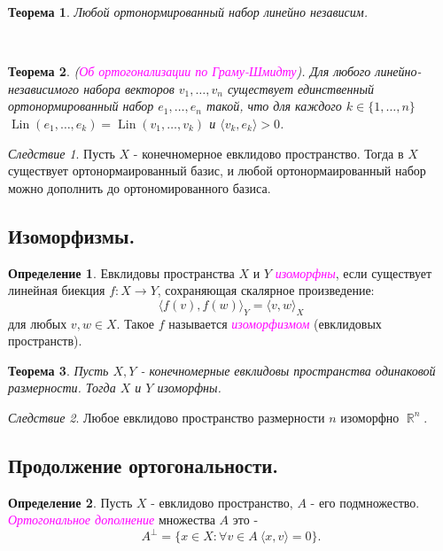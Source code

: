 \documentclass[a4paper,100pt]{article}
\theoremstyle{indented}
\newtheorem{theorem}{Теорема}
\theoremstyle{definition}
\newtheorem{defn}{Определение}
\theoremstyle{remark}
\newtheorem{cons}{Следствие}
\DeclareMathOperator{\ra}{\rightarrow}
\DeclareMathOperator{\RR}{\mathbb{R}}
\DeclareMathOperator{\Lin}{Lin}
\begin{document}
\begin{theorem}
    Любой ортонормированный набор линейно независим.
\end{theorem} \

\begin{theorem}
    (\textit{\textcolor{magenta}{\hypertarget{s64}{Об ортогонализации по Граму-Шмидту}}}). Для любого линейно-независимого набора векторов $v_1, \ldots, v_n$ существует единственный ортонормированный набор $e_1, \ldots, e_n$ такой, что для каждого $k\in \{1, \ldots, n\}$ $\Lin (e_1, \ldots, e_k)=\Lin(v_1, \ldots, v_k)$ и $\langle v_k, e_k \rangle > 0$. 
\end{theorem}

\begin{cons}
    Пусть $X$ - конечномерное евклидово пространство. Тогда в $X$ существует ортонормаированный базис, и любой ортонормаированный набор можно дополнить до ортономированного базиса.
\end{cons}

\subsection{Изоморфизмы.}

\begin{defn}
    Евклидовы пространства $X$ и $Y$ \textit{\textcolor{magenta}{\hypertarget{s65}{изоморфны}}}, если существует линейная биекция $f:X\ra Y$, сохраняющая скалярное произведение: 
    \[
        \langle f(v), f(w) \rangle_Y = \langle v, w \rangle_X
    \]
    для любых $v, w\in X$. Такое $f$ называется \textit{\textcolor{magenta}{\hypertarget{s66}{изоморфизмом}}} (евклидовых пространств).
\end{defn}

\begin{theorem}
    Пусть $X, Y$ - конечномерные евклидовы пространства одинаковой размерности. Тогда $X$ и $Y$ изоморфны.
\end{theorem}

\begin{cons}
    Любое евклидово пространство размерности $n$ изоморфно $\RR^n$. 
\end{cons}

\subsection{Продолжение ортогональности.}

\begin{defn}
    Пусть $X$ - евклидово пространство, $A$ - его подмножество. \textit{\textcolor{magenta}{\hypertarget{s67}{Ортогональное дополнение}}} множества $A$ это - 
    \[
        A^{\perp}=\{x\in X: \forall v\in A \: \langle x, v \rangle = 0\}. 
    \]
\end{defn}
\end{document}
